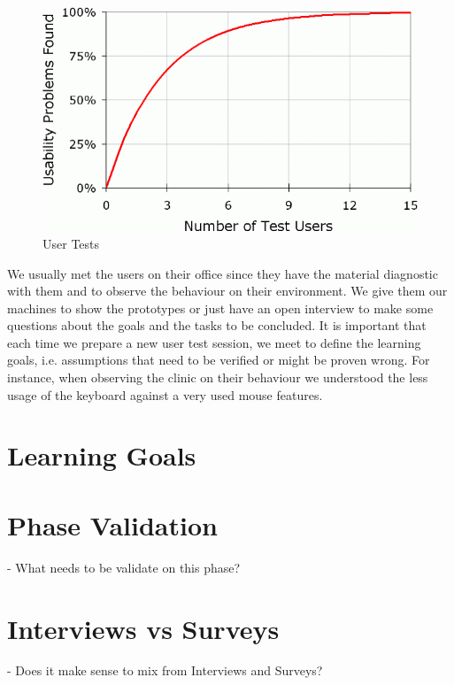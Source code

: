 \begin{figure}[!hbt]
\centering
\includegraphics[width=1.0\textwidth]{number-of-test-users.png}
\caption{\label{fig:frog}User Tests}
\end{figure}

We usually met the users on their office since they have the material diagnostic with them and to observe the behaviour on their environment. We give them our machines to show the prototypes or just have an open interview to make some questions about the goals and the tasks to be concluded. It is important that each time we prepare a new user test session, we meet to define the learning goals, i.e. assumptions that need to be verified or might be proven wrong. For instance, when observing the clinic on their behaviour we understood the less usage of the keyboard against a very used mouse features.

\clearpage

\section{Learning Goals}

\section{Phase Validation}

- What needs to be validate on this phase?

\section{Interviews vs Surveys}

- Does it make sense to mix from Interviews and Surveys?

